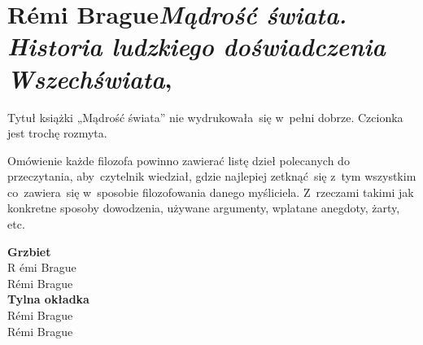 \documentclass[a4paper,11pt]{article}
\numberwithin{equation}{section}
\begin{document}
\VerSpaceTwo


















\section{R\'{e}mi Brague\textit{Mądrość świata. Historia
    ludzkiego doświadczenia Wszechświata},
  \parencite{BragueMadroscSwiata2021}}


\vspace{0em}



\vspace{0em}


\noindent
{} Tytuł książki „Mądrość świata” nie wydrukowała~się
w~pełni dobrze. Czcionka jest trochę rozmyta.

\VerSpaceFour





\noindent
Omówienie każde filozofa powinno zawierać listę dzieł
polecanych do przeczytania, aby~czytelnik wiedział, gdzie najlepiej
zetknąć~się z~tym wszystkim co~zawiera~się w~sposobie filozofowania
danego myśliciela. Z~rzeczami takimi jak konkretne sposoby dowodzenia,
używane argumenty, wplatane anegdoty, żarty, etc.









\VerSpaceFour


\noindent
\textbf{Grzbiet} \\
\Jest R \'{e}mi {\small Brague} \\
\PowinnoByc R\'{e}mi Brague \\
\textbf{Tylna okładka} \\
\Jest R\'{e}mi {\small Brague} \\
\PowinnoByc R\'{e}mi Brague \\
\end{document}

